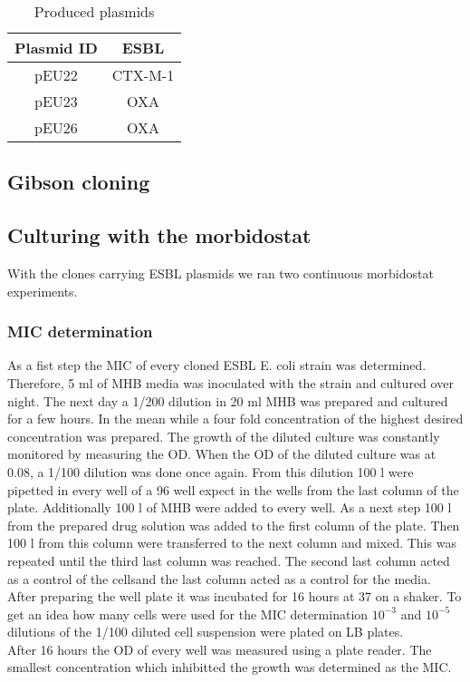 \begin{table}[H]
	\begin{tabular}{|c c|}	
		\hline
		Plasmid ID & ESBL \\
		\hline
		pEU22 & CTX-M-1 \\
		\hline
		pEU23 & OXA \\
		\hline
		pEU26 & OXA \\
		\hline
	\end{tabular}
	\label{table:plasmid}
	\caption{Produced plasmids}
\end{table}
\subsection{Gibson cloning}

\subsection{Culturing with the morbidostat}
With the clones carrying ESBL plasmids  we ran two continuous morbidostat experiments.
\subsubsection{MIC determination}
As a fist step the MIC of every cloned ESBL E. coli strain was determined.
Therefore, 5 ml of MHB media was inoculated with the strain and cultured over night. The next day a 1/200 dilution in 20 ml MHB was prepared and cultured for a few hours. In the mean while a four fold concentration of the highest desired concentration was prepared. The growth of the diluted culture was constantly monitored by measuring the OD. When the OD of the diluted culture was at 0.08, a 1/100 dilution was done once again. From this dilution 100 \textmu l were pipetted in every well of a 96 well expect in the wells from the last column of the plate. Additionally 100 \textmu l of MHB were added to every well. As a next step 100 \textmu l from the prepared drug solution was added to the first column of the plate. Then 100 \textmu l from this column were transferred to the next column and mixed. This was repeated until the third last column was reached. The second last column acted as a control of the cellsand the last column acted as a control for the media. After preparing the well plate it was incubated for 16 hours at 37 \degree \space on a shaker. To get an idea how many cells were used for the MIC determination $10^{-3}$ and $10^{-5}$ dilutions of the 1/100 diluted cell suspension were plated on LB plates.\\
After 16 hours the OD of every well was measured using a plate reader. The smallest concentration which inhibitted the growth was determined as the MIC. 
\label{section:mic_determination}

